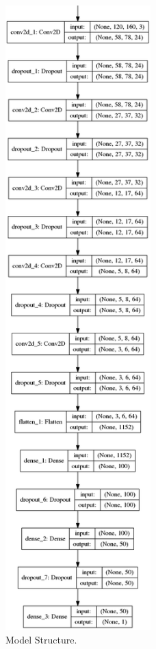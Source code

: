 \documentclass[conference]{IEEEtran}
\begin{document}
\begin{sloppypar}
\begin{figure}[htbp]
\centerline{\includegraphics[width=0.5\textwidth,height=1.0\textheight]{ns.png}}
\caption{Model Structure.}
\label{ms}
\end{figure}


\end{sloppypar}
\end{document}
